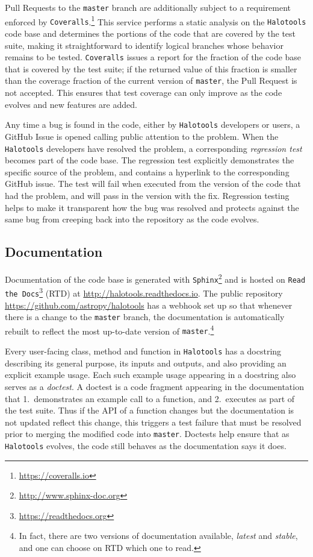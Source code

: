 \documentclass[twocolumn, tighten]{aastex6}
\begin{document}
Pull Requests to the {\tt master} branch are additionally subject to a requirement enforced by {\tt Coveralls}.\footnote{\url{https://coveralls.io}} This service performs a static analysis on the {\tt Halotools} code base and determines the portions of the code that are covered by the test suite, making it straightforward to identify logical branches whose behavior remains to be tested. {\tt Coveralls} issues a report for the fraction of the code base that is covered by the test suite; if the returned value of this fraction is smaller than the coverage fraction of the current version of {\tt master}, the Pull Request is not accepted. This ensures that test coverage can only improve as the code evolves and new features are added.

Any time a bug is found in the code, either by {\tt Halotools} developers or users, a GitHub Issue is opened calling public attention to the problem. When the {\tt Halotools} developers have resolved the problem, a corresponding {\em regression test} becomes part of the code base. The regression test explicitly demonstrates the specific source of the problem, and contains a hyperlink to the corresponding GitHub issue. The test will fail when executed from the version of the code that had the problem, and will pass in the version with the fix. Regression testing helps to make it transparent how the bug was resolved and protects against the same bug from creeping back into the repository as the code evolves.

\subsection{Documentation}
\label{subsection:documentation}

Documentation of the code base is generated with {\tt Sphinx}\footnote{\url{http://www.sphinx-doc.org}} and is hosted on {\tt Read the Docs}\footnote{\url{ https://readthedocs.org}} (RTD) at \url{http://halotools.readthedocs.io}. The public repository \url{https://github.com/astropy/halotools} has a webhook set up so that whenever there is a change to the {\tt master} branch, the documentation is automatically rebuilt to reflect the most up-to-date version of {\tt master}.\footnote{In fact, there are two versions of documentation available, {\em latest} and {\em stable}, and one can choose on RTD which one to read.}

Every user-facing class, method and function in {\tt Halotools} has a docstring describing its general purpose, its inputs and outputs, and also providing an explicit example usage. Each such example usage appearing in a docstring also serves as a {\em doctest}. A doctest is a code fragment appearing in the documentation that 1.~demonstrates an example call to a function, and 2.~executes as part of the test suite. Thus if the API of a function changes but the documentation is not updated reflect this change, this triggers a test failure that must be resolved prior to merging the modified code into {\tt master}. Doctests help ensure that as {\tt Halotools} evolves, the code still behaves as the documentation says it does.
\end{document}
